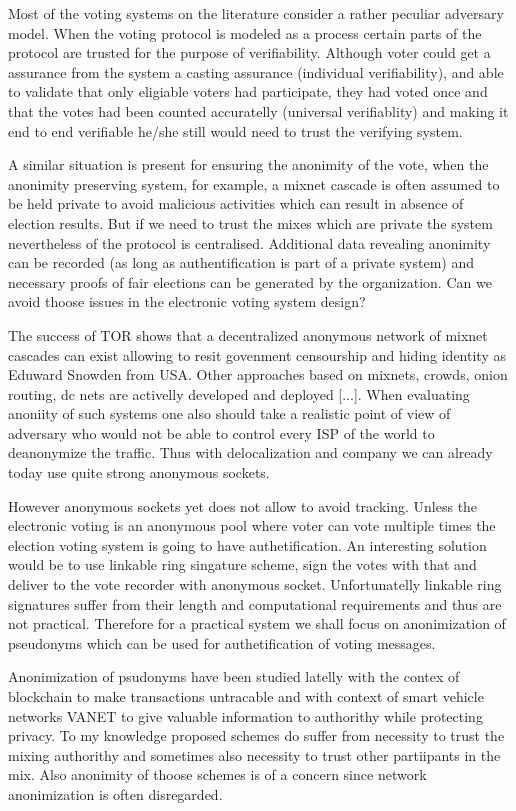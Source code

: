 \documentclass{article}
\begin{document}
Most of the voting systems on the literature consider a rather peculiar adversary model. When the voting protocol is modeled as a process certain parts of the protocol are trusted for the purpose of verifiability. Although voter could get a assurance from the system a casting assurance (individual verifiability), and able to validate that only eligiable voters had participate, they had voted once and that the votes had been counted accuratelly (universal verifiablity) and making it end to end verifiable he/she still would need to trust the verifying system. 

A similar situation is present for ensuring the anonimity of the vote, when the anonimity preserving system, for example, a mixnet cascade is often assumed to be held private to avoid malicious activities which can result in absence of election results. But if we need to trust the mixes which are private the system nevertheless of the protocol is centralised. Additional data revealing anonimity can be recorded (as long as authentification is part of a private system) and necessary proofs of fair elections can be generated by the organization. Can we avoid thoose issues in the electronic voting system design?

The success of TOR shows that a decentralized anonymous network of mixnet cascades can exist allowing to resit govenment censourship and hiding identity as Eduward Snowden from USA. Other approaches based on mixnets, crowds, onion routing, dc nets are activelly developed and deployed [...]. When evaluating anoniity of such systems one also should take a realistic point of view of adversary who would not be able to control every ISP of the world to deanonymize the traffic. Thus with delocalization and company we can already today use quite strong anonymous sockets.

However anonymous sockets yet does not allow to avoid tracking. Unless the electronic voting is an anonymous pool where voter can vote multiple times the election voting system is going to have authetification. An interesting solution would be to use linkable ring singature scheme, sign the votes with that and deliver to the vote recorder with anonymous socket. Unfortunatelly linkable ring signatures suffer from their length and computational requirements and thus are not practical. Therefore for a practical system we shall focus on anonimization of pseudonyms which can be used for authetification of voting messages.

Anonimization of psudonyms have been studied latelly with the contex of blockchain to make transactions untracable and with context of smart vehicle networks VANET to give valuable information to authorithy while protecting privacy. To my knowledge proposed schemes do suffer from necessity to trust the mixing authorithy and sometimes also necessity to trust other partiipants in the mix. Also anonimity of thoose schemes is of a concern since network anonimization is often disregarded.
\end{document}
